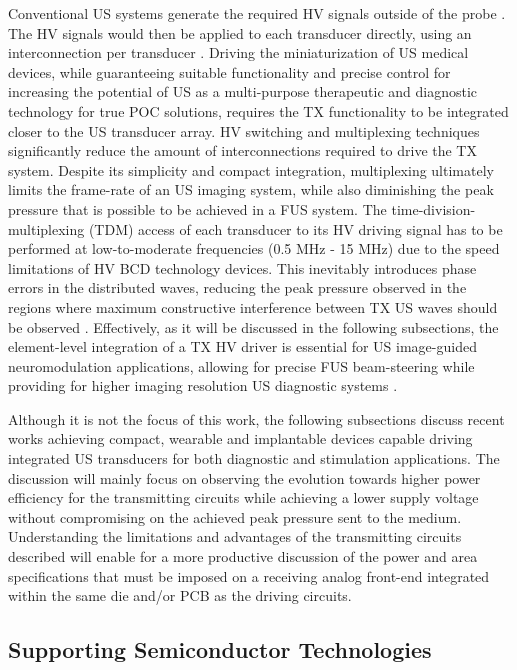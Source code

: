Conventional US systems generate the required HV signals outside of the probe \cite{}. The HV signals would then be applied to each transducer directly, using an interconnection per transducer \cite{}. Driving the miniaturization of US medical devices, while guaranteeing suitable functionality and precise control for increasing the potential of US as a multi-purpose therapeutic and diagnostic technology for true POC solutions, requires the TX functionality to be integrated closer to the US transducer array.  HV switching and multiplexing techniques significantly reduce the amount of interconnections required to drive the TX system. Despite its simplicity and compact integration, multiplexing ultimately limits the frame-rate of an US imaging system, while also diminishing the peak pressure that is possible to be achieved in a FUS system. The time-division-multiplexing (TDM) access of each transducer to its HV driving signal has to be performed at low-to-moderate frequencies (0.5 MHz - 15 MHz) due to the speed limitations of HV BCD technology devices. This inevitably introduces phase errors in the distributed waves, reducing the peak pressure observed in the regions where maximum constructive interference between TX US waves should be observed \cite{}.  Effectively, as it will be discussed in the following subsections, the element-level integration of a TX HV driver is essential for US image-guided neuromodulation  applications, allowing for precise FUS beam-steering while providing for higher imaging resolution US diagnostic systems \cite{beam_steering_tiago_hassan}\cite{milian_tan_pertjis}.

Although it is not the focus of this work, the following subsections discuss recent works achieving compact, wearable and implantable devices capable driving integrated US transducers for both diagnostic and stimulation applications. The discussion will mainly focus on observing the evolution towards higher power efficiency for the transmitting circuits while achieving a lower supply voltage without compromising on the achieved peak pressure sent to the medium. Understanding the limitations and advantages of the transmitting circuits described will enable for a more productive discussion of the power and area specifications that must be imposed on a receiving analog front-end integrated within the same die and/or PCB as the driving circuits.

\subsection{Supporting Semiconductor Technologies}
\label{subsec:supporting_techs}

